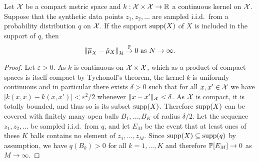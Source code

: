 \begin{lemma}
	\label{lem:projection_consistency}
	Let $\mathcal{X}$ be a compact metric space and $k : \mathcal{X} \times \mathcal{X} \to \mathbb{R}$ a continuous kernel on $\mathcal{X}$. Suppose that the synthetic data points $z_1, z_2, \ldots$ are sampled i.i.d.~from a probability distribution $q$ on $\mathcal{X}$. If the support $\operatorname{supp}(X)$ of $X$ is included in the support of $q$, then
	\begin{equation}
	\left\| \overline{\mu}_X - \hat{\mu}_X \right\|_{\mathcal{H}}
	\stackrel{\mathbb{P}}{\to}
	0
	\text{ as }
	N \to \infty
	.
	\end{equation}
	\begin{proof}
		Let $\varepsilon > 0$. As $k$ is continuous on $\mathcal{X} \times \mathcal{X}$, which as a product of compact spaces is itself compact by Tychonoff's theorem, the kernel $k$ is uniformly continuous and in particular there exists $\delta > 0$ such that for all $x, x' \in \mathcal{X}$ we have $| k(x, x) - k(x, x') | < \varepsilon^2 / 2$ whenever $\| x - x' \|_{\mathcal{X}} < \delta$. As $\mathcal{X}$ is compact, it is totally bounded, and thus so is its subset $\operatorname{supp}(X)$. Therefore $\operatorname{supp}(X)$ can be covered with finitely many open balls $B_1, \ldots, B_{K}$ of radius $\delta / 2$. Let the sequence $z_1, z_2, \ldots$ be sampled i.i.d.~from $q$, and let $E_M$ be the event that at least ones of these $K$ balls contains no element of $z_1, \ldots, z_M$. Since $\operatorname{supp}(X) \subseteq \operatorname{supp}(q)$ by assumption, we have $q(B_k) > 0$ for all $k = 1, \ldots, K$ and therefore $\mathbb{P}[ E_M ] \to 0$ as $M \to \infty$.
		

\end{proof}
\end{lemma}

